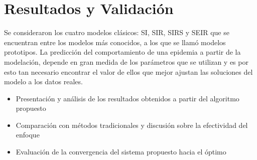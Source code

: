 \chapter{Resultados y Validación}\label{chapter:resultsValidation}
\label{sec:17}

    Se consideraron los cuatro modelos clásicos:
    SI, SIR, SIRS y SEIR que se encuentran entre los modelos más conocidos, a los
    que se llamó modelos prototipos.
    La predicción del comportamiento de una epidemia a partir de la modelación,
    depende en gran medida de los parámetros que se utilizan y es por esto tan
    necesario encontrar el valor de ellos que mejor ajustan las soluciones del modelo
    a los datos reales. \\

    \begin{itemize}
        \item  Presentación y análisis de los resultados obtenidos a partir del algoritmo propuesto
        \item  Comparación con métodos tradicionales y discusión sobre la efectividad del enfoque
        \item  Evaluación de la convergencia del sistema propuesto hacia el óptimo
    \end{itemize}
